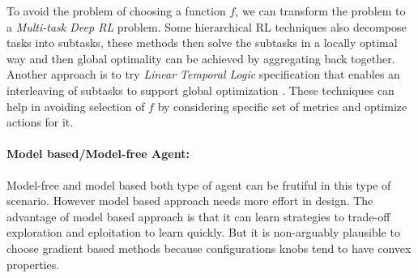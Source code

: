 To avoid the problem of choosing a function $f$, we can transform the problem to a {\em Multi-task Deep RL} problem.
Some hierarchical RL techniques also decompose tasks into subtasks, these methods then solve the subtasks
in a locally optimal way and then global optimality can be achieved by aggregating back together. Another approach is to try {\em Linear Temporal Logic} specification that enables an interleaving of subtasks to support global optimization \cite{icarte2018teaching}.
These techniques can help in avoiding selection of $f$ by considering specific set of metrics and optimize actions for it.


\paragraph{Model based/Model-free Agent:}
Model-free and model based both type of agent can be frutiful in this type of scenario. However model based approach needs more effort in design.
The advantage of model based approach is that it can learn strategies to trade-off exploration and eploitation to learn quickly.
But it is non-arguably plausible to choose gradient based methods because configurations knobs tend to have convex properties. 



